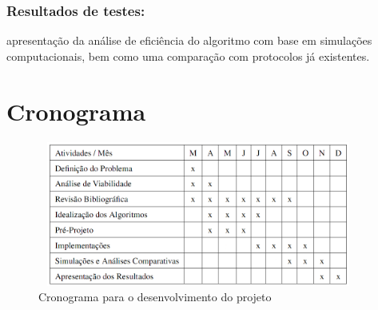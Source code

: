  \subsubsection{Resultados de testes:} apresentação da análise de eficiência do algoritmo com base em simulações computacionais, bem como uma comparação com protocolos já existentes.
 
 \section{Cronograma}
 
\begin{figure}[!htb]
\centering
\includegraphics[width=400px,height=180px]{./Pictures/cronograma.png}
\caption{Cronograma para o desenvolvimento do projeto} %
\label{fig:cronograma} %
\end{figure}